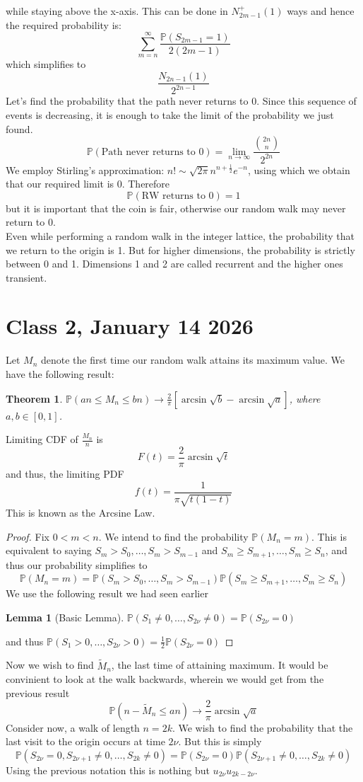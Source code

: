 \documentclass{article}
\newtheorem{theorem}{Theorem}
\newtheorem{lemma}{Lemma}
\begin{document}
while staying above the x-axis. This can be done in $N^{+}_{2m-1}(1)$ ways and hence the required probability is:
$$\sum_{m=n}^{\infty}\frac{\mathbb{P}(S_{2m-1}=1)}{2(2m-1)}$$ 
which simplifies to $$\frac{N_{2n-1}(1)}{2^{2n-1}}$$
Let's find the probability that the path never returns to 0. Since this sequence of events is decreasing, it is enough to take the limit of the probability we just found.
$$\mathbb{P}(\text{Path never returns to }0)=\lim_{n\to\infty}\frac{\binom{2n}{n}}{2^{2n}}$$
We employ Stirling's approximation: $n!\sim\sqrt{2\pi}n^{n+\frac{1}{2}}e^{-n}$,
using which we obtain that our required limit is 0. Therefore 
$$\mathbb{P}(\text{RW returns to 0})=1$$
but it is important that the coin is fair, otherwise our random walk may never return to 0.\\
Even while performing a random walk in the integer lattice, the probability that we return to the origin is 1. But for higher dimensions, the probability is strictly between 0 and 1. Dimensions 1 and 2 are called recurrent and the higher ones transient.
\section*{Class 2, January 14 2026}
Let $M_n$ denote the first time our random walk attains its maximum value. We have the following result:
\begin{theorem}
$\mathbb{P}(an\leq M_n \leq bn)\to\frac{2}{\pi}[\arcsin{\sqrt{b}}-\arcsin{\sqrt{a}}]$, where $a,b\in [0,1]$.
\end{theorem}
Limiting CDF of $\frac{M_n}{n}$ is$$F(t)=\frac{2}{\pi}\arcsin{\sqrt{t}}$$
and thus, the limiting PDF
$$f(t)=\frac{1}{\pi\sqrt{t(1-t)}}$$
This is known as the Arcsine Law.\\
\begin{proof}
Fix $0<m<n$. We intend to find the probability $\mathbb{P}(M_n=m)$.
This is equivalent to saying $S_m>S_0,\dots,S_m>S_{m-1}$ and $S_m\geq S_{m+1},\dots,S_m\geq S_n$, 
and thus our probability simplifies to
$$\mathbb{P}(M_n=m)=\mathbb{P}(S_m>S_0,\dots,S_m>S_{m-1})\mathbb{P}(S_m\geq S_{m+1},\dots,S_m\geq S_n)$$
We use the following result we had seen earlier
\begin{lemma}[Basic Lemma]
    $\mathbb{P}(S_1\neq 0,\dots, S_{2\nu}\neq 0)=\mathbb{P}(S_{2\nu}=0)$
\end{lemma}
and thus $\mathbb{P}(S_1>0,\dots,S_{2\nu}>0)=\frac{1}{2}\mathbb{P}(S_{2\nu}=0)$
\end{proof}
Now we wish to find $\tilde{M}_n$, the last time of attaining maximum. It would be convinient to look at the walk backwards, wherein we would get from the previous result
$$\mathbb{P}(n-\tilde{M}_n\leq an)\to \frac{2}{\pi}\arcsin{\sqrt{a}}$$
Consider now, a walk of length $n=2k$. We wish to find the probability that the last visit to the origin occurs at time $2\nu$.
But this is simply
$$\mathbb{P}(S_{2\nu}=0,S_{2\nu +1}\neq 0,\dots,S_{2k}\neq 0)=\mathbb{P}(S_{2\nu}=0)\mathbb{P}(S_{2\nu +1}\neq 0,\dots,S_{2k}\neq 0)$$
Using the previous notation this is nothing but $u_{2\nu}u_{2k-2\nu}$.
\end{document}
